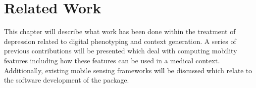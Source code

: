 \chapter{Related Work}
\label{chapter:02}
This chapter will describe what work has been done within the treatment of depression related to digital phenotyping and context generation. A series of previous contributions will be presented which deal with computing mobility features including how these features can be used in a medical context. Additionally, existing mobile sensing frameworks will be discussed which relate to the software development of the package. 





